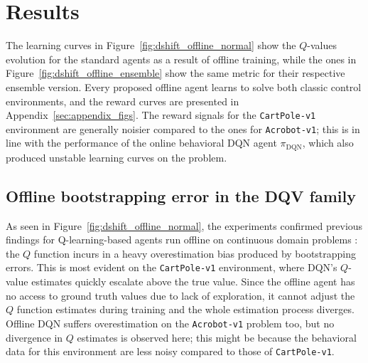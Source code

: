 \section{Results}\label{sec:results}
The learning curves in Figure~\ref{fig:dshift_offline_normal} show the
$Q$-values evolution for the standard agents as a result of offline
training, while the ones in Figure~\ref{fig:dshift_offline_ensemble}
show the same metric for their respective ensemble version. Every
proposed offline agent learns to solve both classic control
environments, and the reward curves are presented in
Appendix~\ref{sec:appendix_figs}.
The reward signals for the \texttt{CartPole-v1} environment are
generally noisier compared to the ones for \texttt{Acrobot-v1}; this
is in line
with the performance of the online behavioral DQN agent
$\pi_{\textrm{DQN}}$, which also produced unstable learning curves on
the problem.

\subsection{Offline bootstrapping error in the DQV family}
As seen in Figure~\ref{fig:dshift_offline_normal}, the experiments
confirmed
previous findings for Q-learning-based agents run offline on continuous
domain problems \citep{pmlr-v97-fujimoto19a,kumar2019stabilizing}: the
$Q$ function incurs in a heavy overestimation bias produced by
bootstrapping errors. This is most evident on the \texttt{CartPole-v1}
environment, where DQN's $Q$-value estimates quickly escalate above
the true value. Since the offline agent has no access to ground truth
values due to lack of exploration, it cannot adjust the $Q$ function
estimates during training and the whole estimation process
diverges. Offline DQN suffers overestimation on the
\texttt{Acrobot-v1} problem too, but no divergence in $Q$ estimates is
observed here; this might be because the behavioral data for this
environment are less noisy compared to those of \texttt{CartPole-v1}.

